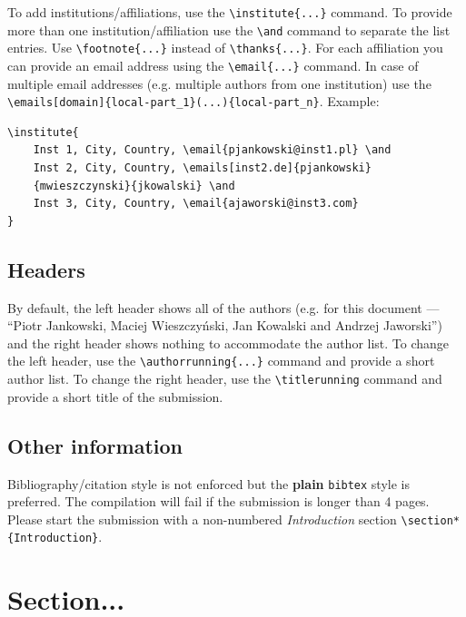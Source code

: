 \documentclass{ceccsub}
\begin{document}
To add institutions/affiliations, use the \lstinline|\institute{...}| command. To provide more than one institution/affiliation use the \lstinline|\and| command to separate the list entries. Use \lstinline|\footnote{...}| instead of \lstinline|\thanks{...}|. For each affiliation you can provide an email address using the \lstinline|\email{...}| command. In case of multiple email addresses (e.g. multiple authors from one institution) use the \lstinline|\emails[domain]{local-part_1}(...){local-part_n}|. Example:

\begin{lstlisting}
\institute{
    Inst 1, City, Country, \email{pjankowski@inst1.pl} \and 
    Inst 2, City, Country, \emails[inst2.de]{pjankowski}
    {mwieszczynski}{jkowalski} \and
    Inst 3, City, Country, \email{ajaworski@inst3.com}
}
\end{lstlisting}

\subsection{Headers}

By default, the left header shows all of the authors (e.g. for this document --- ``Piotr Jankowski, Maciej Wieszczyński, Jan Kowalski and Andrzej Jaworski'') and the right header shows nothing to accommodate the author list. To change the left header, use the \lstinline|\authorrunning{...}| command and provide a short author list. To change the right header, use the \lstinline|\titlerunning| command and provide a short title of the submission.

\subsection{Other information}

Bibliography/citation style is not enforced but the \textbf{plain} \lstinline|bibtex| style is preferred. The compilation will fail if the submission is longer than 4 pages.
Please start the submission with a non-numbered \textit{Introduction} section \lstinline|\section*{Introduction}|.

\section{Section...}


\nocite{*}

\end{document}
